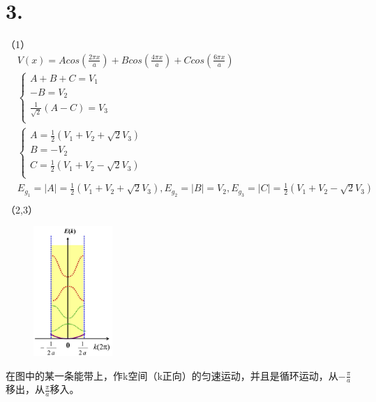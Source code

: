 \documentclass[UTF8]{ctexart}
\begin{document}
\section*{3.}
（1）
\begin{equation*}
    \begin{aligned}
        & V(x)=Acos(\frac{2\pi x}{a})+Bcos(\frac{4\pi x}{a})+Ccos(\frac{6\pi x}{a})\\
        & \begin{cases}
            A+B+C=V_1\\
            -B=V_2\\
            \frac{1}{\sqrt2}(A-C)=V_3\\
        \end{cases}\\
        & \begin{cases}
            A=\frac{1}{2}(V_1+V_2+\sqrt2 V_3)\\
            B=-V_2\\
            C=\frac{1}{2}(V_1+V_2-\sqrt2 V_3)\\
        \end{cases}\\
        & E_{g_1}=\lvert A\rvert = \frac{1}{2}(V_1+V_2+\sqrt2 V_3), E_{g_2}=\lvert B\rvert = V_2, E_{g_3}=\lvert C\rvert = 
        \frac{1}{2}(V_1+V_2-\sqrt2 V_3)\\
    \end{aligned}
\end{equation*}
（2,3）
\begin{figure}
    \includegraphics[width=3cm]{ans-3-2.jpg}
    \caption*{}
\end{figure}
在图中的某一条能带上，作k空间（k正向）的匀速运动，并且是循环运动，从$-\frac{\pi}{a}$移出，从$\frac{\pi}{a}$移入。\\
\newline\newline\newline\newline\newline\newline\newline\newline\newline
\end{document}
